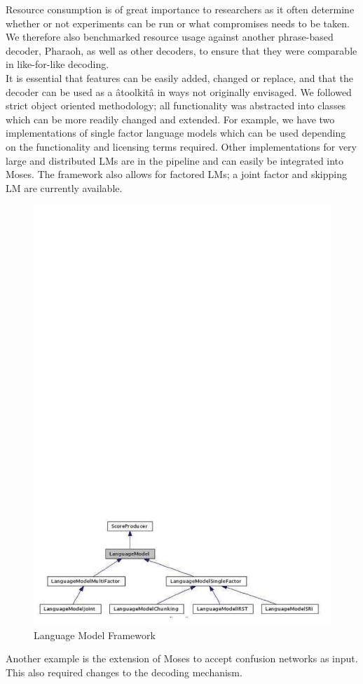 \documentclass[10pt]{report}
\theoremstyle{plain}
\begin{document}
{Resource consumption is of great importance to researchers as it often determine whether or not experiments can be run or what compromises needs to be taken. We therefore also benchmarked resource usage against another phrase-based decoder, Pharaoh, as well as other decoders, to ensure that they were comparable in like-for-like decoding.\\

It is essential that features can be easily added, changed or replace, and that the decoder can be used as a âtoolkitâ in ways not originally envisaged. We followed strict object oriented methodology; all functionality was abstracted into classes which can be more readily changed and extended. For example, we have two implementations of single factor language models which can be used depending on the functionality and licensing terms required. Other implementations for very large and distributed LMs are in the pipeline and can easily be integrated into Moses. The framework also allows for factored LMs; a joint factor and skipping LM are currently available.\\
\begin{center}
\begin{figure}[h]
\centering
\includegraphics[scale=1]{hieu-2}
\caption{Language Model Framework}
\end{figure}
\end{center}
Another example is the extension of Moses to accept confusion networks as input. This also required changes to the decoding mechanism.\\

}
\end{document}
